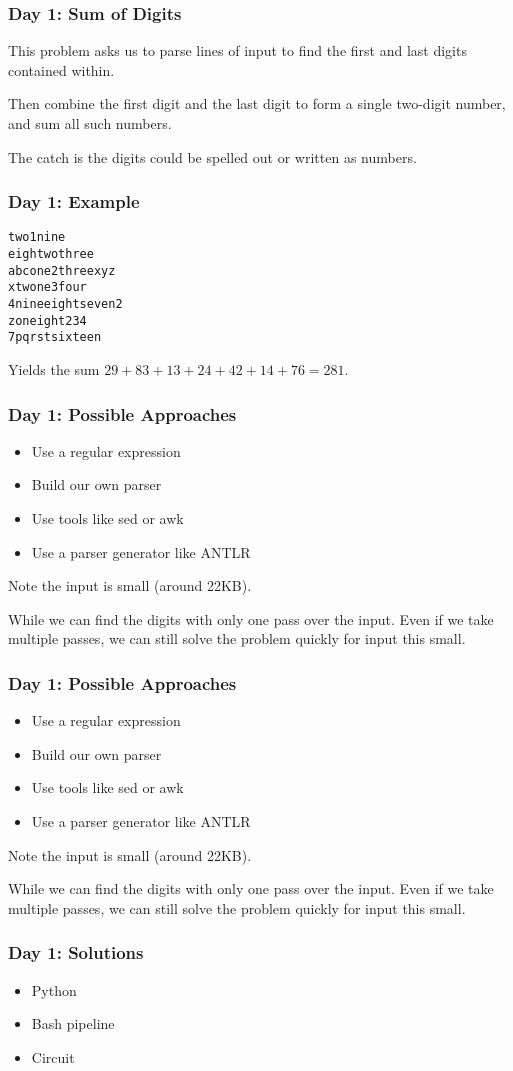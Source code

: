 \begin{frame}
\frametitle{Day 1: Sum of Digits}

This problem asks us to parse lines of input to find the first and last digits contained within.\vfill

Then combine the first digit and the last digit to form a single two-digit number, and sum all such numbers.\vfill

The catch is the digits could be spelled out or written as numbers.
\end{frame}

\begin{frame}[fragile]
\frametitle{Day 1: Example}

\begin{verbatim}
two1nine
eightwothree
abcone2threexyz
xtwone3four
4nineeightseven2
zoneight234
7pqrstsixteen
\end{verbatim}

Yields the sum $29 + 83 + 13 + 24 + 42 + 14 + 76 = 281$.

\end{frame}

\begin{frame}
\frametitle{Day 1: Possible Approaches}

\begin{itemize}
    \item Use a regular expression
    \item Build our own parser
    \item Use tools like sed or awk
    \item Use a parser generator like ANTLR
\end{itemize}\vfill

Note the input is small (around 22KB).\vfill

While we can find the digits with only one pass over the input. Even if we
take multiple passes, we can still solve the problem quickly for input
this small.
\end{frame}

\begin{frame}
\frametitle{Day 1: Possible Approaches}

\begin{itemize}
    \item Use a regular expression
    \item Build our own parser
    \item Use tools like sed or awk
    \item Use a parser generator like ANTLR
\end{itemize}\vfill

Note the input is small (around 22KB).\vfill

While we can find the digits with only one pass over the input. Even if we
take multiple passes, we can still solve the problem quickly for input
this small.
\end{frame}

\begin{frame}
\frametitle{Day 1: Solutions}

\begin{itemize}
    \item Python
    \item Bash pipeline
    \item Circuit
\end{itemize}

\end{frame}

